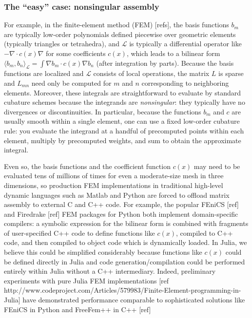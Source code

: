 \subsubsection{The ``easy'' case: nonsingular assembly}

For example, in the finite-element method (FEM) [refs], the basis functions $b_m$ are typically low-order polynomials defined piecewise over geometric elements (typically triangles or tetrahedra), and $\mathcal{L}$ is typically a differential operator like $-\nabla \cdot c(x) \nabla$ for some coefficients $c(x)$, which leads to a bilinear form  $\langle b_m, b_n \rangle_\mathcal{L} = \int \nabla b_m \cdot c(x) \nabla b_n$ (after integration by parts).   Because the basis functions are localized and $\mathcal{L}$ consists of local operations, the matrix $L$ is sparse and $L_{mn}$ need only be computed for $m$ and $n$ corresponding to neighboring elements. Moreover, these integrals are straightforward to evaluate by standard cubature schemes because the integrands are \emph{nonsingular}: they typically have no divergences or discontinuities. In particular, because the functions $b_m$ and $c$ are usually smooth within a single element, one can use a fixed low-order cubature rule: you evaluate the integrand at a handful of precomputed points within each element, multiply by precomputed weights, and sum to obtain the approximate integral.

Even so, the basis functions and the coefficient function $c(x)$ may need to be evaluated tens of millions of times for even a moderate-size mesh in three dimensions, so production FEM implementations in traditional high-level dynamic languages such as Matlab and Python are forced to offload matrix assembly to external C and C++ code.  For example, the popular FEniCS [ref] and Firedrake [ref] FEM packages for Python both implement domain-specific compilers: a symbolic expression for the bilinear form is combined with fragments of user-specified C++ code to define functions like $c(x)$, compiled to C++ code, and then compiled to object code which is dynamically loaded. In Julia, we believe this could be simplified considerably because functions like $c(x)$ could be defined directly in Julia and code generation/compilation could be performed entirely within Julia without a C++ intermediary.  Indeed, preliminary experiments with pure Julia FEM implementations [ref http://www.codeproject.com/Articles/579983/Finite-Element-programming-in-Julia] have demonstrated performance comparable to sophisticated solutions like FEniCS in Python and FreeFem++ in C++ [ref]

